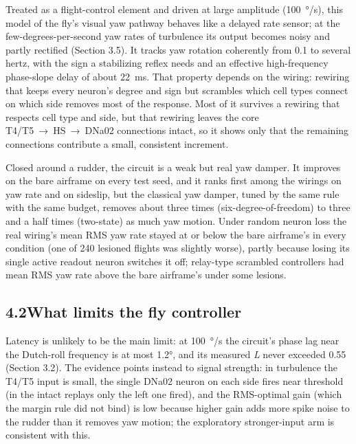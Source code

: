 \documentclass[11pt,letterpaper]{article}
\begin{document}
\noindent Treated as a flight-control element and driven at large
amplitude (100~°/s), this model of the fly's visual yaw pathway behaves
like a delayed rate sensor; at the few-degrees-per-second yaw rates of
turbulence its output becomes noisy and partly rectified (Section 3.5).
It tracks yaw rotation coherently from 0.1 to several hertz, with the
sign a stabilizing reflex needs and an effective high-frequency
phase-slope delay of about 22~ms. That property depends on the wiring:
rewiring that keeps every neuron's degree and sign but scrambles which
cell types connect on which side removes most of the response. Most of
it survives a rewiring that respects cell type and side, but that
rewiring leaves the core T4/T5~→~HS~→~DNa02 connections intact, so it
shows only that the remaining connections contribute a small, consistent
increment.

Closed around a rudder, the circuit is a weak but real yaw damper. It
improves on the bare airframe on every test seed, and it ranks first
among the wirings on yaw rate and on sideslip, but the classical yaw
damper, tuned by the same rule with the same budget, removes about three
times (six-degree-of-freedom) to three and a half times (two-state) as
much yaw motion. Under random neuron loss the real wiring's mean RMS yaw
rate stayed at or below the bare airframe's in every condition (one of
240 lesioned flights was slightly worse), partly because losing its
single active readout neuron switches it off; relay-type scrambled
controllers had mean RMS yaw rate above the bare airframe's under some
lesions.

\subsection{\texorpdfstring{4.2\quad What limits the fly
controller}{4.2What limits the fly controller}}\label{what-limits-the-fly-controller}

\noindent Latency is unlikely to be the main limit: at 100~°/s the
circuit's phase lag near the Dutch-roll frequency is at most 1.2°, and
its measured \textbar{}\emph{L}\textbar{} never exceeded 0.55 (Section
3.2). The evidence points instead to signal strength: in turbulence the
T4/T5 input is small, the single DNa02 neuron on each side fires near
threshold (in the intact replays only the left one fired), and the
RMS-optimal gain (which the margin rule did not bind) is low because
higher gain adds more spike noise to the rudder than it removes yaw
motion; the exploratory stronger-input arm is consistent with this.
\end{document}
